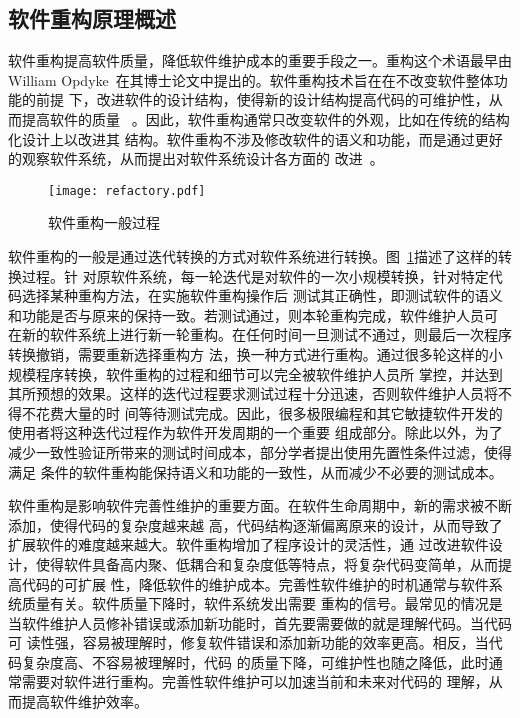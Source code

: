 \subsection{软件重构原理概述}

软件重构提高软件质量，降低软件维护成本的重要手段之一。重构这个术语最早由William
Opdyke~\cite{opdyke1992refactoring}在其博士论文中提出的。软件重构技术旨在在不改变软件整体功能的前提
下，改进软件的设计结构，使得新的设计结构提高代码的可维护性，从而提高软件的质量
~\cite{fowler1999refactoring}。因此，软件重构通常只改变软件的外观，比如在传统的结构化设计上以改进其
结构。软件重构不涉及修改软件的语义和功能，而是通过更好的观察软件系统，从而提出对软件系统设计各方面的
改进~\cite{chikofsky1990reverse}。

\begin{figure}
  \centering
  \texttt{[image: refactory.pdf]}  
  \caption{\label{fig:refactory}软件重构一般过程}
\end{figure}

软件重构的一般是通过迭代转换的方式对软件系统进行转换。图~\ref{fig:refactory}描述了这样的转换过程。针
对原软件系统，每一轮迭代是对软件的一次小规模转换，针对特定代码选择某种重构方法，在实施软件重构操作后
测试其正确性，即测试软件的语义和功能是否与原来的保持一致。若测试通过，则本轮重构完成，软件维护人员可
在新的软件系统上进行新一轮重构。在任何时间一旦测试不通过，则最后一次程序转换撤销，需要重新选择重构方
法，换一种方式进行重构。通过很多轮这样的小规模程序转换，软件重构的过程和细节可以完全被软件维护人员所
掌控，并达到其所预想的效果。这样的迭代过程要求测试过程十分迅速，否则软件维护人员将不得不花费大量的时
间等待测试完成。因此，很多极限编程和其它敏捷软件开发的使用者将这种迭代过程作为软件开发周期的一个重要
组成部分。除此以外，为了减少一致性验证所带来的测试时间成本，部分学者提出使用先置性条件过滤，使得满足
条件的软件重构能保持语义和功能的一致性，从而减少不必要的测试成本。

软件重构是影响软件完善性维护的重要方面。在软件生命周期中，新的需求被不断添加，使得代码的复杂度越来越
高，代码结构逐渐偏离原来的设计，从而导致了扩展软件的难度越来越大。软件重构增加了程序设计的灵活性，通
过改进软件设计，使得软件具备高内聚、低耦合和复杂度低等特点，将复杂代码变简单，从而提高代码的可扩展
性，降低软件的维护成本。完善性软件维护的时机通常与软件系统质量有关。软件质量下降时，软件系统发出需要
重构的信号。最常见的情况是当软件维护人员修补错误或添加新功能时，首先要需要做的就是理解代码。当代码可
读性强，容易被理解时，修复软件错误和添加新功能的效率更高。相反，当代码复杂度高、不容易被理解时，代码
的质量下降，可维护性也随之降低，此时通常需要对软件进行重构。完善性软件维护可以加速当前和未来对代码的
理解，从而提高软件维护效率。

